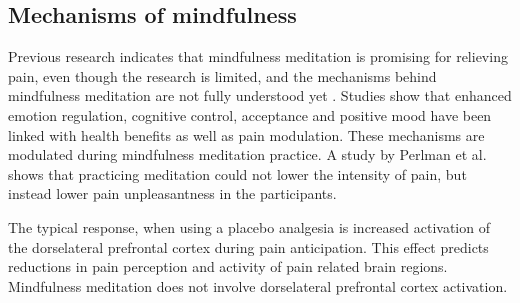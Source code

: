 


\subsection{Mechanisms of mindfulness}

Previous research indicates that mindfulness meditation is promising for relieving pain, even though the research is limited, and the mechanisms behind mindfulness meditation are not fully understood yet \cite{Perlman2010}. 
Studies show that enhanced emotion regulation, cognitive control, acceptance and positive mood have been linked with health benefits as well as pain modulation. These mechanisms are modulated during mindfulness meditation practice. A study by Perlman et al. \cite{Perlman2010} shows that practicing meditation could not lower the intensity of pain, but instead lower pain unpleasantness in the participants. \cite{Zeidan2012, Perlman2010}


The typical response, when using a placebo analgesia is increased activation of the dorselateral prefrontal cortex during pain anticipation. This effect predicts reductions in pain perception and activity of pain related brain regions. Mindfulness meditation does not involve dorselateral prefrontal cortex activation. \cite{Zeidan2012}


